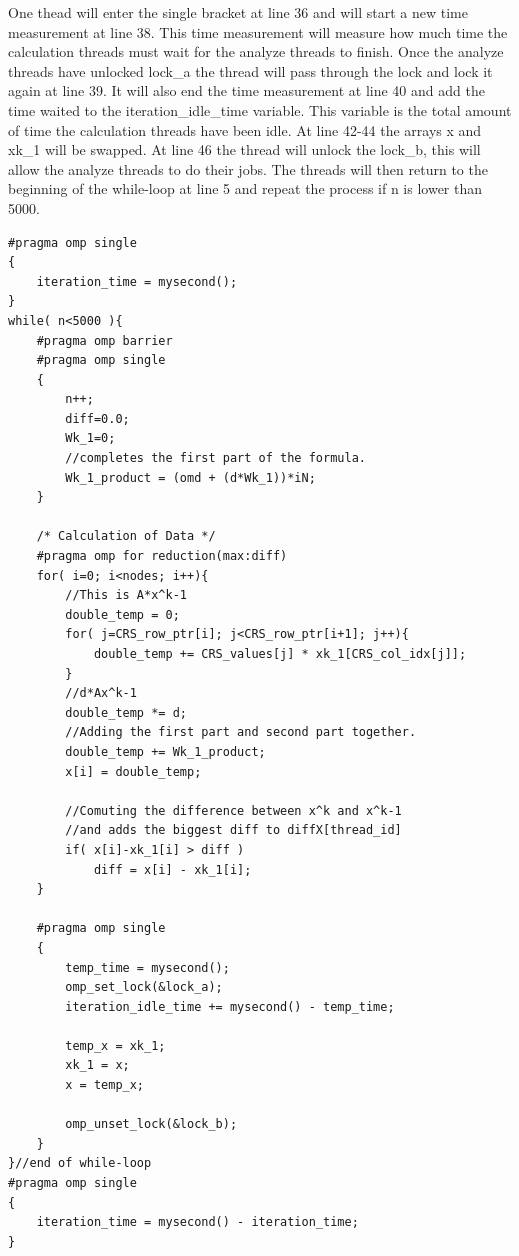 \documentclass[12pt,a4paper,USenglish]{article}      %
\begin{document}
One thead will enter the single bracket at line 36 and will start a new time measurement at line 38. This time measurement will measure how much time the calculation threads must wait for the analyze threads to finish. Once the analyze threads have unlocked lock\_a the thread will pass through the lock and lock it again at line 39. It will also end the time measurement at line 40 and add the time waited to the iteration\_idle\_time variable. This variable is the total amount of time the calculation threads have been idle.
At line 42-44 the arrays x and xk\_1 will be swapped. At line 46 the thread will unlock the lock\_b, this will allow the analyze threads to do their jobs. The threads will then return to the beginning of the while-loop at line 5 and repeat the process if n is lower than 5000.


\begin{lstlisting}[caption=Calculation]
#pragma omp single
{
	iteration_time = mysecond();
}
while( n<5000 ){ 
	#pragma omp barrier
	#pragma omp single
	{
		n++;
		diff=0.0;	
		Wk_1=0;
		//completes the first part of the formula.
		Wk_1_product = (omd + (d*Wk_1))*iN;
	}
	
	/* Calculation of Data */
	#pragma omp for reduction(max:diff)
	for( i=0; i<nodes; i++){
		//This is A*x^k-1
		double_temp = 0;
		for( j=CRS_row_ptr[i]; j<CRS_row_ptr[i+1]; j++){ 
			double_temp += CRS_values[j] * xk_1[CRS_col_idx[j]];
		}
		//d*Ax^k-1
		double_temp *= d;
		//Adding the first part and second part together.
		double_temp += Wk_1_product;
		x[i] = double_temp;

		//Comuting the difference between x^k and x^k-1
		//and adds the biggest diff to diffX[thread_id]
		if( x[i]-xk_1[i] > diff )
			diff = x[i] - xk_1[i];
	}

	#pragma omp single
	{
		temp_time = mysecond();
		omp_set_lock(&lock_a);
		iteration_idle_time += mysecond() - temp_time;

		temp_x = xk_1;
		xk_1 = x;
		x = temp_x;
		
		omp_unset_lock(&lock_b);
	}
}//end of while-loop
#pragma omp single
{
	iteration_time = mysecond() - iteration_time;
}
\end{lstlisting}
\end{document}
